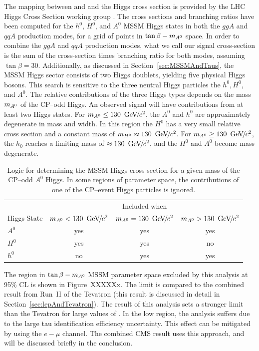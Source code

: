 The mapping between \ma and \tb and the Higgs cross section is provided by the
LHC Higgs Cross Section working group .  The cross sections and
branching ratios have been computed for the $h^0$, $H^0$, and $A^0$ MSSM Higgs
states in both the $ggA$ and $qqA$ production modes, for a grid of points in
$\mbox{\ensuremath{\tan\beta}}-m_{A^0}$ space.  In order to combine the $ggA$ and $qqA$ production modes, what
we call our signal cross-section is the sum of the cross-section times branching
ratio for both modes, assuming \mbox{$\tan\beta = 30$}.  Additionally, as
discussed in Section~\ref{sec:MSSMAndTaus}, the MSSM Higgs sector consists of
two Higgs doublets, yielding five physical Higgs bosons.  This search is
sensitive to the three neutral Higgs particles the $h^0, H^0$, and $A^0$.  The
relative contributions of the three Higgs types depends on the mass $\ma$ of the
CP--odd Higgs.  An observed signal will have contributions from at least two
Higgs states.   For $m_{A^0} \leq 130~{\,\text{Ge\hspace{-.08em}V\hspace{-0.16em}/\hspace{-0.08em}}c^\text{2}}$, the $A^0$ and $h^0$ are approximately
degenerate in mass and width.  In this region the $H^0$ has a very small
relative cross section and a constant mass of $m_{H^0} \approx 130~{\,\text{Ge\hspace{-.08em}V\hspace{-0.16em}/\hspace{-0.08em}}c^\text{2}}$.  For
$m_{A^0} \geq 130~{\,\text{Ge\hspace{-.08em}V\hspace{-0.16em}/\hspace{-0.08em}}c^\text{2}}$, the $h_0$ reaches a limiting mass of $\approx
130~{\,\text{Ge\hspace{-.08em}V\hspace{-0.16em}/\hspace{-0.08em}}c^\text{2}}$, and the $H^0$ and $A^0$ become mass degenerate.   
%
\begin{table}
  \centering
  \begin{tabular}{l|ccc} 
                & \multicolumn{3}{|c}{Included when} \\
    Higgs State & $m_{A^0} < 130~{\,\text{Ge\hspace{-.08em}V\hspace{-0.16em}/\hspace{-0.08em}}c^\text{2}}$ & $m_{A^0} = 130~{\,\text{Ge\hspace{-.08em}V\hspace{-0.16em}/\hspace{-0.08em}}c^\text{2}}$ & $m_{A^0} > 130~{\,\text{Ge\hspace{-.08em}V\hspace{-0.16em}/\hspace{-0.08em}}c^\text{2}}$ \\
    \hline
    $A^0$       & yes & yes & yes \\
    $H^0$       & yes & yes & no \\
    $h^0$       & no & yes & yes \\
  \end{tabular}
  \caption[Contributions of different MSSM Higgs boson types at different
  $\ma$.]{Logic for determining the MSSM Higgs cross section for a given mass of
  the CP--odd $A^0$ Higgs.  In some regions of parameter space, the
  contributions of one of the
  CP--event Higgs particles is ignored.}
  \label{tab:HiggsXSectionCombination}
\end{table}

The region in $\mbox{\ensuremath{\tan\beta}}-m_{A^0}$ MSSM parameter space excluded by this analysis at 95\% CL 
is shown in Figure~XXXXXx.  The limit is compared to the combined result from
\mbox{Run II} of the Tevatron (this result is discussed in detail in 
Section~\ref{sec:lepAndTevatron}).  The result of this analysis sets a stronger
limit  than the Tevatron for large values of \ma.  In the
low \ma region, the analysis suffers due to the large tau identification
efficiency uncertainty.  This effect can be mitigated by using the $e-\mu$
channel.  The combined CMS result uses this approach, and will be discussed
briefly in the conclusion.

\ifx\master\undefined\fi
